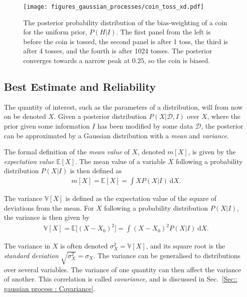\documentclass[twoside,english]{uiofysmaster}
\begin{document}
{{\begin{figure}
\texttt{[image: figures\_gaussian\_processes/coin\_toss\_xd.pdf]}
\caption{The posterior probability distribution of the bias-weighting of a coin for the uniform prior, $P(H|I)$. The first panel from the left is before the coin is tossed, the second panel is after 1 toss, the third is after 4 tosses, and the fourth is after 1024 tosses. The posterior converges towards a narrow peak at $0.25$, so the coin is biased.}
\label{Fig:: gaussian process : Dice throw }
\end{figure}


\subsection{Best Estimate and Reliability}\label{Sec:: gaussian process : Best estimate}

The quantity of interest, such as the parameters of a distribution, will from now on be denoted $X$. Given a posterior distribution $P(X| \mathcal{D}, I)$ over $X$, where the prior given some information $I$ has been modified by some data $\mathcal{D}$, the posterior can be approximated by a Gaussian distribution with a \textit{mean} and \textit{variance}. 

The formal definition of the \textit{mean value} of $X$, denoted $m[X]$, is given by the \textit{expectation value} $\mathbb{E}[X]$. The mean value of a variable $X$ following a probability distribution $P(X |  I)$ is then defined as
\begin{align}\label{Eq:: gaussian process : Expectation value}
m[X] = \mathbb{E}[X] = \int X P(X | I) ~\text{d}X .
\end{align}

The variance $\mathbb{V} [X]$ is defined as the expectation value of the square of deviations from the mean. For $X$ following a probability distribution $P(X | I)$, the variance is then given by 
\begin{align}\label{Eq:: gaussian process : variance X 1dim}
\mathbb{V}[X] = \mathbb{E} \big[ (X - X_0)^2 \big] = \int  (X - X_0)^2 P (X| I) ~\text{d}X.
\end{align}

The variance in $X$ is often denoted $\sigma_X^2 = \mathbb{V}[X]$, and its square root is the \textit{standard deviation} $\sqrt{\sigma^2_X} = \sigma_X$. The variance can be generalised to distributions over several variables. The variance of one quantity can then affect the variance of another. This correlation is called \textit{covariance}, and is discussed in Sec.~\ref{Sec:: gaussian process : Covariance}.

}}
\end{document}
